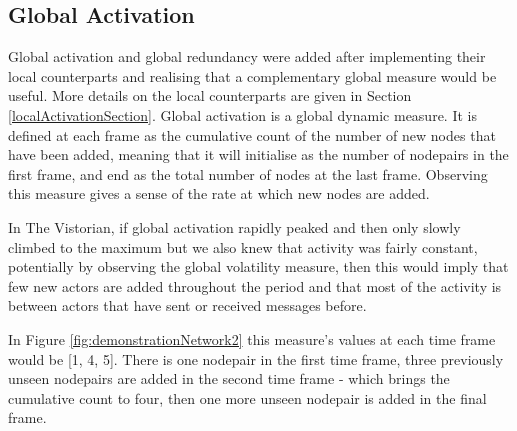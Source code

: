 




\subsection{Global Activation}
Global activation and global redundancy were added after implementing their local counterparts and realising that a complementary global measure would be useful. More details on the local counterparts are given in Section \ref{localActivationSection}. Global activation is a global dynamic measure. It is defined at each frame as the cumulative count of the number of new nodes that have been added, meaning that it will initialise as the number of nodepairs in the first frame, and end as the total number of nodes at the last frame. Observing this measure gives a sense of the rate at which new nodes are added. 

In The Vistorian, if global activation rapidly peaked and then only slowly climbed to the maximum but we also knew that activity was fairly constant, potentially by observing the global volatility measure, then this would imply that few new actors are added throughout the period and that most of the activity is between actors that have sent or received messages before.

In Figure \ref{fig:demonstrationNetwork2} this measure's values at each time frame would be [1, 4, 5]. There is one nodepair in the first time frame, three previously unseen nodepairs are added in the second time frame - which brings the cumulative count to four, then one more unseen nodepair is added in the final frame.

